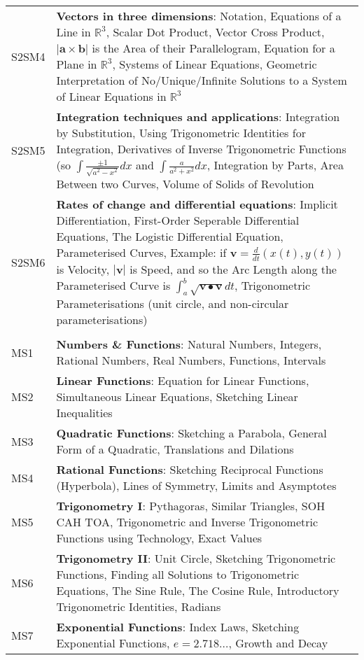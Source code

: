 \documentclass[varwidth=144mm, 12pt]{standalone}
\begin{document}
\begin{longtable}{lp{}}
S2SM4 & \textbf{Vectors in three dimensions}: Notation, Equations of a Line in $\mathbb{R}^3$, Scalar Dot Product, Vector Cross Product, $|\mathbf{a} \times \mathbf{b}|$ is the Area of their Parallelogram, Equation for a Plane in $\mathbb{R}^3$, Systems of Linear Equations, Geometric Interpretation of No/Unique/Infinite Solutions to a System of Linear Equations in $\mathbb{R}^3$ \\
S2SM5 & \textbf{Integration techniques and applications}: Integration by Substitution, Using Trigonometric Identities for Integration, Derivatives of Inverse Trigonometric Functions (so $\int{\frac{\pm1}{\sqrt{a^2-x^2}}dx}$ and $\int{\frac{a}{a^2+x^2}dx}$, Integration by Parts, Area Between two Curves, Volume of Solids of Revolution \\
S2SM6 & \textbf{Rates of change and differential equations}: Implicit Differentiation, First-Order Seperable Differential Equations, The Logistic Differential Equation, Parameterised Curves, Example: if $\mathbf{v} = \frac{d}{dt}(x(t),y(t))$ is Velocity, $|\mathbf{v}|$ is Speed, and so the Arc Length along the Parameterised Curve is $\int_a^b{\sqrt{\mathbf{v} \bullet \mathbf{v}}dt}$, Trigonometric Parameterisations (unit circle, and non-circular parameterisations) \\
& \\
MS1 & \textbf{Numbers \& Functions}: Natural Numbers, Integers, Rational Numbers, Real Numbers, Functions, Intervals \\
MS2 & \textbf{Linear Functions}: Equation for Linear Functions, Simultaneous Linear Equations, Sketching Linear Inequalities \\
MS3 & \textbf{Quadratic Functions}: Sketching a Parabola, General Form of a Quadratic, Translations and Dilations \\
MS4 & \textbf{Rational Functions}: Sketching Reciprocal Functions (Hyperbola), Lines of Symmetry, Limits and Asymptotes \\
MS5 & \textbf{Trigonometry I}: Pythagoras, Similar Triangles, SOH CAH TOA, Trigonometric and Inverse Trigonometric Functions using Technology, Exact Values\\
MS6 & \textbf{Trigonometry II}: Unit Circle, Sketching Trigonometric Functions, Finding all Solutions to Trigonometric Equations, The Sine Rule, The Cosine Rule, Introductory Trigonometric Identities, Radians \\
MS7 & \textbf{Exponential Functions}: Index Laws, Sketching Exponential Functions, $e = 2.718\hdots$, Growth and Decay\\

\end{longtable}
\end{document}
